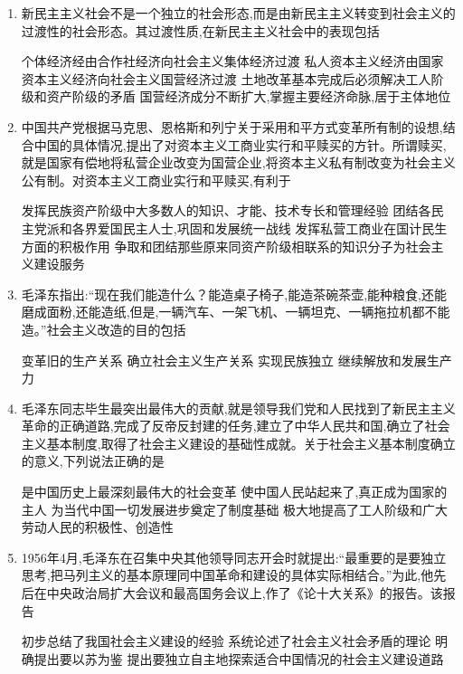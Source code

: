 \documentclass[12pt, a4paper, oneside, UTF8]{ctexbook}
\begin{document}
\begin{enumerate}
    \item 新民主主义社会不是一个独立的社会形态,而是由新民主主义转变到社会主义的过渡性的社会形态。其过渡性质,在新民主主义社会中的表现包括
    \begin{choices}[1]
    \task 个体经济经由合作社经济向社会主义集体经济过渡
    \task 私人资本主义经济由国家资本主义经济向社会主义国营经济过渡
    \task 土地改革基本完成后必须解决工人阶级和资产阶级的矛盾
    \task 国营经济成分不断扩大,掌握主要经济命脉,居于主体地位
    \end{choices}

    \item 中国共产党根据马克思、恩格斯和列宁关于采用和平方式变革所有制的设想,结合中国的具体情况,提出了对资本主义工商业实行和平赎买的方针。所谓赎买,就是国家有偿地将私营企业改变为国营企业,将资本主义私有制改变为社会主义公有制。对资本主义工商业实行和平赎买,有利于
    \begin{choices}[1]
    \task 发挥民族资产阶级中大多数人的知识、才能、技术专长和管理经验
    \task 团结各民主党派和各界爱国民主人士,巩固和发展统一战线
    \task 发挥私营工商业在国计民生方面的积极作用
    \task 争取和团结那些原来同资产阶级相联系的知识分子为社会主义建设服务
    \end{choices}

    \item 毛泽东指出:“现在我们能造什么？能造桌子椅子,能造茶碗茶壶,能种粮食,还能磨成面粉,还能造纸,但是,一辆汽车、一架飞机、一辆坦克、一辆拖拉机都不能造。”社会主义改造的目的包括
    \begin{choices}[1]
    \task 变革旧的生产关系
    \task 确立社会主义生产关系
    \task 实现民族独立
    \task 继续解放和发展生产力
    \end{choices}

    \item 毛泽东同志毕生最突出最伟大的贡献,就是领导我们党和人民找到了新民主主义革命的正确道路,完成了反帝反封建的任务,建立了中华人民共和国,确立了社会主义基本制度,取得了社会主义建设的基础性成就。关于社会主义基本制度确立的意义,下列说法正确的是
    \begin{choices}[1]
    \task 是中国历史上最深刻最伟大的社会变革
    \task 使中国人民站起来了,真正成为国家的主人
    \task 为当代中国一切发展进步奠定了制度基础
    \task 极大地提高了工人阶级和广大劳动人民的积极性、创造性
    \end{choices}

    \item 1956年4月,毛泽东在召集中央其他领导同志开会时就提出:“最重要的是要独立思考,把马列主义的基本原理同中国革命和建设的具体实际相结合。”为此,他先后在中央政治局扩大会议和最高国务会议上,作了《论十大关系》的报告。该报告
    \begin{choices}[1]
    \task 初步总结了我国社会主义建设的经验
    \task 系统论述了社会主义社会矛盾的理论
    \task 明确提出要以苏为鉴
    \task 提出要独立自主地探索适合中国情况的社会主义建设道路
    \end{choices}


\end{enumerate}
\end{document}
